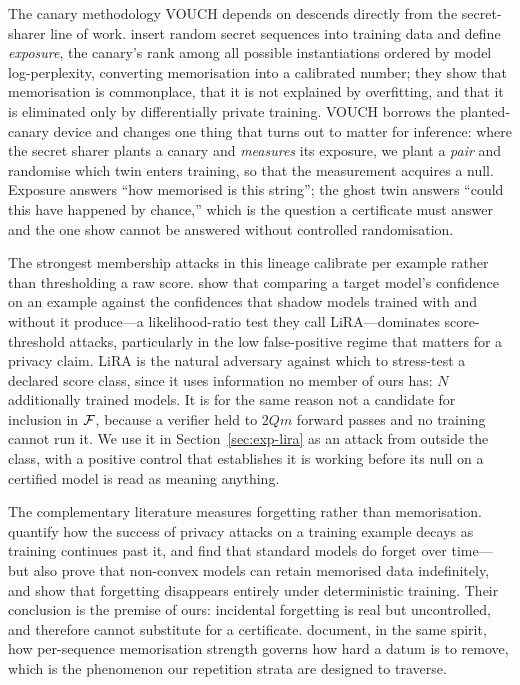 The canary methodology VOUCH depends on descends directly from the secret-sharer line
of work. \citet{carlini2019secret} insert random secret sequences into training data
and define \emph{exposure}, the canary's rank among all possible instantiations
ordered by model log-perplexity, converting memorisation into a calibrated number;
they show that memorisation is commonplace, that it is not explained by overfitting,
and that it is eliminated only by differentially private training. VOUCH borrows the
planted-canary device and changes one thing that turns out to matter for inference:
where the secret sharer plants a canary and \emph{measures} its exposure, we plant a
\emph{pair} and randomise which twin enters training, so that the measurement acquires
a null. Exposure answers ``how memorised is this string''; the ghost twin answers
``could this have happened by chance,'' which is the question a certificate must
answer and the one \citet{zhang2024mia} show cannot be answered without controlled
randomisation.

The strongest membership attacks in this lineage calibrate per example rather than
thresholding a raw score. \citet{carlini2022lira} show that comparing a target model's
confidence on an example against the confidences that shadow models trained with and
without it produce---a likelihood-ratio test they call LiRA---dominates score-threshold
attacks, particularly in the low false-positive regime that matters for a privacy
claim. LiRA is the natural adversary against which to stress-test a declared score
class, since it uses information no member of ours has: $N$ additionally trained
models. It is for the same reason not a candidate for inclusion in $\mathcal{F}$, because a
verifier held to $2Qm$ forward passes and no training cannot run it. We use it in
Section~\ref{sec:exp-lira} as an attack from outside the class, with a positive
control that establishes it is working before its null on a certified model is read as
meaning anything.

The complementary literature measures forgetting rather than memorisation.
\citet{jagielski2023measuring} quantify how the success of privacy attacks on a
training example decays as training continues past it, and find that standard models
do forget over time---but also prove that non-convex models can retain memorised data
indefinitely, and show that forgetting disappears entirely under deterministic
training. Their conclusion is the premise of ours: incidental forgetting is real but
uncontrolled, and therefore cannot substitute for a certificate.
\citet{barbulescu2024each} document, in the same spirit, how per-sequence memorisation
strength governs how hard a datum is to remove, which is the phenomenon our
repetition strata are designed to traverse.

